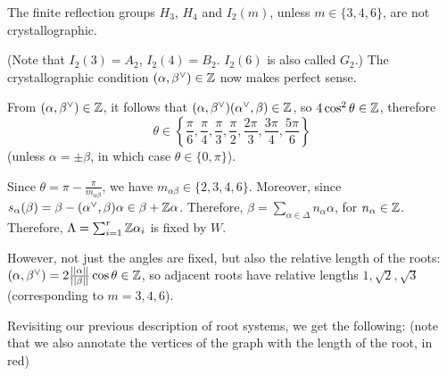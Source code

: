 \begin{corollary} \label{cor20}
The finite reflection groups $H_3$, $H_4$ and $I_2(m)$, unless
$m \in \{3,4,6\}$, are not crystallographic.
\end{corollary}

(Note that $I_2(3) = A_2$, $I_2(4) = B_2$. $I_2(6)$ is also called $G_2$.)
The crystallographic condition $(\alpha, \beta^\vee) \in \mathbb{Z}$ now makes perfect
sense.

From $(\alpha, \beta^\vee) \in \mathbb{Z}$, it follows that $(\alpha, \beta^\vee)
(\alpha^\vee, \beta) \in \mathbb{Z}$, so $4 \cos^2 \theta \in \mathbb{Z}$, therefore
\[ \theta \in \left\{\frac{\pi}{6}, \frac{\pi}{4}, \frac{\pi}{3}, \frac{\pi}{2},
\frac{2\pi}{3}, \frac{3\pi}{4}, \frac{5\pi}{6}\right\} \] (unless
$\alpha = \pm \beta$, in which case $\theta \in \{0, \pi\}$).

Since $\theta = \pi - \frac{\pi}{m_{\alpha \beta}}$, we have $m_{\alpha \beta}
\in \{2,3,4,6\}$. Moreover, since $s_\alpha(\beta) = \beta -
(\alpha^\vee, \beta) \alpha \in \beta + \mathbb{Z} \alpha$. Therefore, $\beta
= \sum_{\alpha \in \Delta} n_\alpha \alpha$, for $n_\alpha \in \mathbb{Z}$.
Therefore, $\Lambda = \sum_{i=1}^r \mathbb{Z} \alpha_i$ is fixed by $W$.

However, not just the angles are fixed, but also the relative length of the
roots: $(\alpha, \beta^\vee) = 2\frac{||\alpha||}{||\beta||} \cos \theta \in \mathbb{Z}$,
so adjacent roots have relative lengths $1, \sqrt{2}, \sqrt{3}$ (corresponding to
$m = 3, 4, 6$).

Revisiting our previous description of root systems, we get the following:
(note that we also annotate the vertices of the graph with the length of the
root, in red)

